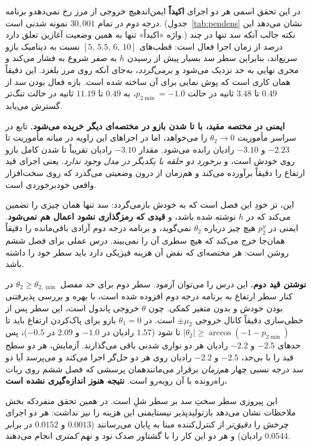 \documentclass[10pt,twocolumn]{article}
\newcommand{\en}[1]{\lr{#1}}
\newcommand{\md}{\lr{\textemdash}}
\begin{document}
در این تحقق اسمی هر دو اجرای \en{ECBF} \textbf{اکیداً} ایمن‌اند\md{}هیچ خروجی از مرز
رخ نمی‌دهد\md{}و برنامه درجه دوم در تمام $30{,}001$ نمونه شدنی است. (جدول~\ref{tab:pendens}
نشان می‌دهد این واژه «اکیداً» تنها به همین وضعیت آغازین تعلق دارد.) نکته جالب آنکه سد تنها در
چند درصد از زمان اجرا فعال است: قطب‌های $[5,\,5.5,\,6,\,10]$ نسبت به دینامیک
بازو سریع‌اند، بنابراین سطر سد بسیار پیش از رسیدن $h$ به صفر شروع به فشار
می‌کند و مجری نهایی به حد نزدیک می‌شود و \emph{برمی‌گردد}، به‌جای آنکه روی مرز
بلغزد. این دقیقاً همان کاری است که پوش نمایی برای آن ساخته شده است. بازه فعال
بودن سد از $0.49$ تا $3.48$ ثانیه در حالت $p_{2\min}=-1.0$، به $0.49$ تا $11.19$
ثانیه در حالت تنگ‌تر گسترش می‌یابد.

\textbf{ایمنی در مختصه مقید، با تا شدن بازو در مختصه‌ای دیگر خریده می‌شود.} تابع
\en{CLF} در سراسر مأموریت $\theta_2\to 0$ را می‌خواهد، اما در اجراهای \en{ECBF}
این زاویه در میانه مأموریت تا $-2.23$ و $-3.10$ رادیان رانده می‌شود. مقدار
$-3.10$ رادیان تقریباً تا شدن کامل بازو روی خودش است، و \emph{برخورد دو حلقه با
یکدیگر در مدل وجود ندارد}. یعنی اجرای \en{ECBF} قید ارتفاع را دقیقاً برآورده
می‌کند و هم‌زمان از درون وضعیتی می‌گذرد که روی سخت‌افزار واقعی خودبرخوردی است.

این، تز خودِ این فصل است که به خودش بازمی‌گردد: سد تنها همان چیزی را تضمین می‌کند
که در $h$ نوشته شده باشد، و \textbf{قیدی که رمزگذاری نشود اعمال هم نمی‌شود}.
ایمنی در $p_2^y$ هیچ چیز درباره $\theta_2$ نمی‌گوید، و برنامه درجه دوم آزادی
باقی‌مانده را دقیقاً همان‌جا خرج می‌کند که هیچ سطری آن را نمی‌بیند. درس عملی برای
فصل ششم روشن است: هر مختصه‌ای که نقض آن هزینه فیزیکی دارد باید سطر خود را داشته
باشد.

\textbf{نوشتن قید دوم.} این درس را می‌توان آزمود. سطر دوم \en{ECBF} برای حد مفصل
$\theta_2\ge\theta_{2,\min}$ در کنار سطر ارتفاع به برنامه درجه دوم افزوده شده است، با بهره و
بررسی پذیرفتنی بودن خودش و بدون متغیر کمکی. چون $\theta$ خروجی پاندول است، این سطر پس از
خطی‌سازی دقیقاً کانال خروجی $\pm\mu_2$ است. در $\theta_1=0$ بازو برای پاک‌کردن ارتفاع باید تا
$|\theta_2|\ge\arccos(-1-p_{2\min})$ تا شود ($1.57$ رادیان در $-1.0$ و $2.09$ در $-0.5$)،
پس حدهای $-2.5$ و $-2.2$ رادیان هر دو نواری شدنی باقی می‌گذارند. آزمایش، هر دو سطح قید را با
بی‌حد، $-2.5$ و $-2.2$ رادیان روی هر دو حل‌گر اجرا می‌کند و می‌پرسد آیا دو سد درجه نسبی
چهار \emph{هم‌زمان} برقرار می‌مانند\md{}همان پرسشی که فصل ششم روی ربات راه‌رونده با آن
روبه‌رو است. \textbf{نتیجه هنوز اندازه‌گیری نشده است.}

این پیروزی سطر سختِ سد بر سطر شلِ \en{CLF} است. در همین تحقق منفرد\md{}که بخش ملاحظات نشان می‌دهد
بازتولیدپذیر نیست\md{}ایمنی این هزینه را نیز نداشت: هر دو اجرای \en{ECBF} چرخش را \emph{دقیق‌تر} از
کنترل‌کننده مبنا به پایان می‌رسانند ($0.0013$ و $0.0152$ در برابر $0.0544$
رادیان) و هر دو این کار را با گشتاور صدک نود و نهم \emph{کمتری} انجام می‌دهند.
\end{document}
